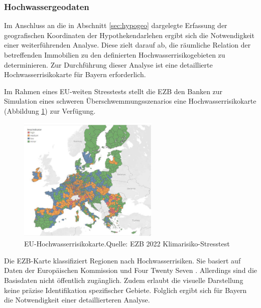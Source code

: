 \subsubsection{Hochwassergeodaten}\label{sec:hochgeo}

Im Anschluss an die in Abschnitt \ref{sec:hypogeo} dargelegte Erfassung der geografischen Koordinaten der Hypothekendarlehen ergibt sich die Notwendigkeit einer weiterführenden Analyse. Diese zielt darauf ab, die räumliche Relation der betreffenden Immobilien zu den definierten Hochwasserrisikogebieten zu determinieren. Zur Durchführung dieser Analyse ist eine detaillierte Hochwasserrisikokarte für Bayern erforderlich.

Im Rahmen eines EU-weiten Stresstests stellt die \ac{EZB} den Banken zur Simulation eines schweren Überschwemmungsszenarios eine Hochwasserrisikokarte (Abbildung \ref{fig:euflut}) zur Verfügung.

\begin{figure}[htbp]
    \centering
    \includegraphics[width=0.6\textwidth]{figures/euflood.png} 
    \caption{EU-Hochwasserrisikokarte.Quelle: EZB 2022 Klimarisiko-Stresstest}
    \label{fig:euflut}
\end{figure}
\FloatBarrier

Die EZB-Karte klassifiziert Regionen nach Hochwasserrisiken. Sie basiert auf Daten der Europäischen Kommission und Four Twenty Seven \parencite{ECB2022ClimateStressTest}. Allerdings sind die Basisdaten nicht öffentlich zugänglich. Zudem erlaubt die visuelle Darstellung keine präzise Identifikation spezifischer Gebiete. Folglich ergibt sich für Bayern die Notwendigkeit einer detaillierteren Analyse.

